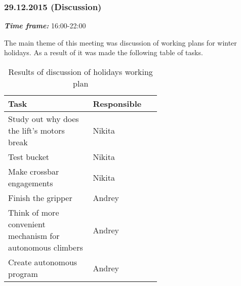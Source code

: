 \subsubsection{29.12.2015 (Discussion)}
\textit{\textbf{Time frame:}} 16:00-22:00 \newline

The main theme of this meeting was discussion of working plans for winter holidays. As a result of it was made the following table of tasks.
\begin{table}[H]
	\caption{Results of discussion of holidays working plan}
	\label{tabular:meetingSPB28.12}
	\begin{center}
		\begin{tabular}{|p{0.4\linewidth}|p{0.2\linewidth}|}
			\hline
			Task & Responsible \\
			\hline
			Study out why does the lift's motors break & Nikita \\
			\hline
			Test bucket & Nikita \\
			\hline
			Make crossbar engagements	& Nikita \\
			\hline
			Finish the gripper & Andrey \\
			\hline
			Think of more convenient mechanism for autonomous climbers & Andrey \\
			\hline
			Create autonomous program & Andrey \\
			\hline
		\end{tabular}
	\end{center}
\end{table}
